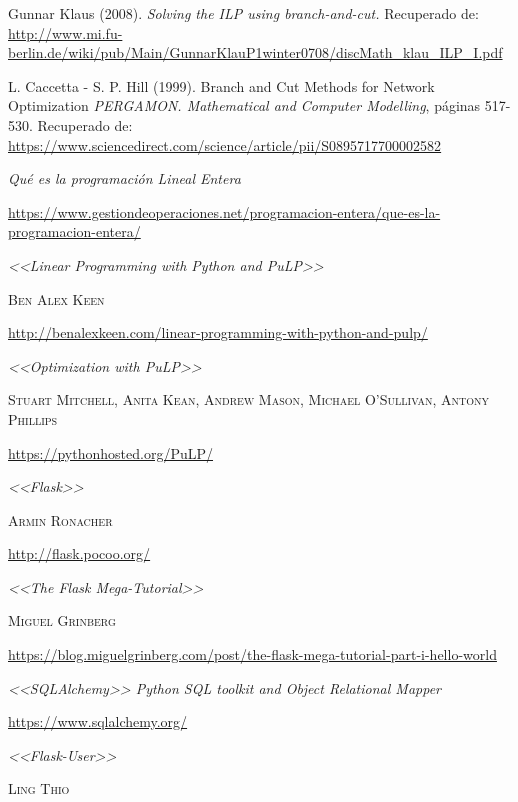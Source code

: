 \documentclass[a4paper]{article}
\begin{document}
\begin{thebibliography}{X}
 Gunnar Klaus (2008).  \textit{Solving the ILP using branch-and-cut.}
Recuperado de: \url{http://www.mi.fu-berlin.de/wiki/pub/Main/GunnarKlauP1winter0708/discMath_klau_ILP_I.pdf}


 L. Caccetta - S. P. Hill (1999). Branch and Cut Methods for Network Optimization  \textit{PERGAMON. Mathematical and Computer Modelling}, páginas 517-530.
Recuperado de: \url{https://www.sciencedirect.com/science/article/pii/S0895717700002582}
 

 \textit{Qué es la programación Lineal Entera}

\url{https://www.gestiondeoperaciones.net/programacion-entera/que-es-la-programacion-entera/}


 \textit{<<Linear Programming with Python and PuLP>>}

\textsc{Ben Alex Keen}

\url{http://benalexkeen.com/linear-programming-with-python-and-pulp/}


 \textit{<<Optimization with PuLP>>}

\textsc{Stuart Mitchell, Anita Kean, Andrew Mason, Michael O’Sullivan, Antony Phillips}

\url{https://pythonhosted.org/PuLP/}


 \textit{<<Flask>>}

\textsc{Armin Ronacher}

\url{http://flask.pocoo.org/}


 \textit{<<The Flask Mega-Tutorial>>}

\textsc{Miguel Grinberg}

\url{https://blog.miguelgrinberg.com/post/the-flask-mega-tutorial-part-i-hello-world}

 \textit{<<SQLAlchemy>> Python SQL toolkit and Object Relational Mapper}

\url{https://www.sqlalchemy.org/}

 \textit{<<Flask-User>>}

\textsc{Ling Thio}


\end{thebibliography}
\end{document}
